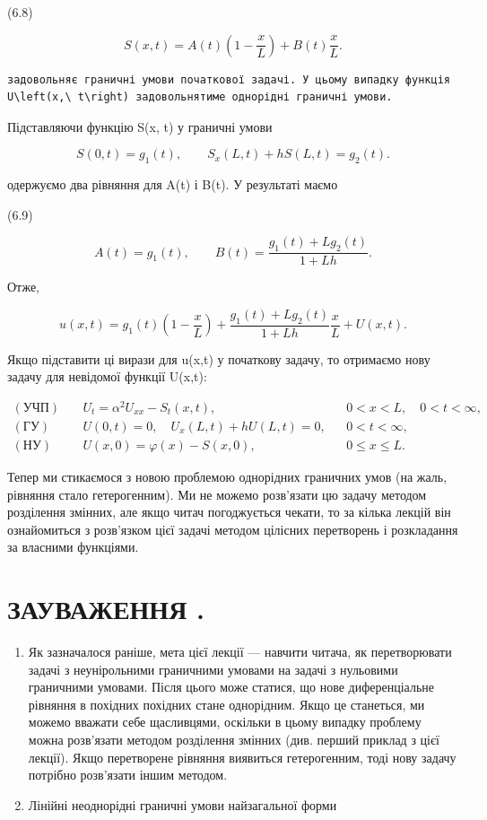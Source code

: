 \documentclass[
  ukrainian,
]{article}
\begin{document}
(6.8)

\[
S(x, t)=A(t)\left(1-\frac{x}{L}\right)+B(t)\frac{x}{L}.
\]

\begin{verbatim}
задовольняє граничні умови початкової задачі. У цьому випадку функція U\left(x,\ t\right) задовольнятиме однорідні граничні умови.
\end{verbatim}

Підставляючи функцію S(x, t) у граничні умови

\[
S(0, t)=g_1(t), \qquad S_x(L, t)+hS(L, t)=g_2(t).
\]

одержуємо два рівняння для A(t) і B(t). У результаті маємо

(6.9)

\[
A(t)=g_1(t), \qquad B(t)=\frac{g_1(t)+Lg_2(t)}{1+Lh}.
\]

Отже,

\[
u(x, t)=g_1(t)\left(1-\frac{x}{L}\right)+\frac{g_1(t)+Lg_2(t)}{1+Lh}\frac{x}{L}+U(x, t).
\]

Якщо підставити ці вирази для u(x,t) у початкову задачу, то отримаємо
нову задачу для невідомої функції U(x,t):

\[
\begin{aligned}
(\text{УЧП})\quad & U_t = \alpha^2 U_{xx} - S_t(x,t), && 0 < x < L,\quad 0 < t < \infty, \\
(\text{ГУ})\quad & U(0,t) = 0,\quad U_x(L,t) + hU(L,t) = 0, && 0 < t < \infty, \\
(\text{НУ})\quad & U(x,0) = \varphi(x) - S(x,0), && 0 \leqslant x \leqslant L.
\end{aligned}
\]

Тепер ми стикаємося з новою проблемою однорідних граничних умов (на
жаль, рівняння стало гетерогенним). Ми не можемо розв'язати цю задачу
методом розділення змінних, але якщо читач погоджується чекати, то за
кілька лекцій він ознайомиться з розв'язком цієї задачі методом цілісних
перетворень і розкладання за власними функціями.

\section{ЗАУВАЖЕННЯ
.}\label{ux437ux430ux443ux432ux430ux436ux435ux43dux43dux44f-.}

\begin{enumerate}
\def\labelenumi{\arabic{enumi}.}
\item
  Як зазначалося раніше, мета цієї лекції --- навчити читача, як
  перетворювати задачі з неунірольними граничними умовами на задачі з
  нульовими граничними умовами. Після цього може статися, що нове
  диференціальне рівняння в похідних похідних стане однорідним. Якщо це
  станеться, ми можемо вважати себе щасливцями, оскільки в цьому випадку
  проблему можна розв'язати методом розділення змінних (див. перший
  приклад з цієї лекції). Якщо перетворене рівняння виявиться
  гетерогенним, тоді нову задачу потрібно розв'язати іншим методом.
\item
  Лінійні неоднорідні граничні умови найзагальної форми
\end{enumerate}
\end{document}
